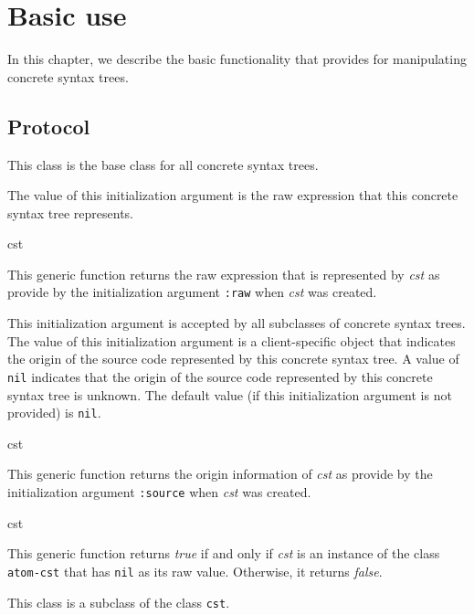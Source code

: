 \chapter{Basic use}

In this chapter, we describe the basic functionality that \sysname{}
provides for manipulating concrete syntax trees.

\section{Protocol}


This class is the base class for all concrete syntax trees.


The value of this initialization argument is the raw \commonlisp{}
expression that this concrete syntax tree represents.

 {cst}

This generic function returns the raw \commonlisp{} expression that is
represented by \textit{cst} as provide by the
initialization argument \texttt{:raw} when \textit{cst} was
created.


This initialization argument is accepted by all subclasses of concrete
syntax trees.  The value of this initialization argument is a
client-specific object that indicates the origin of the source code
represented by this concrete syntax tree.  A value of \texttt{nil}
indicates that the origin of the source code represented by this concrete
syntax tree is unknown.  The default value (if this initialization
argument is not provided) is \texttt{nil}.

 {cst}

This generic function returns the origin information of \textit{cst}
as provide by the initialization argument \texttt{:source} when
\textit{cst} was created.

 {cst}

This generic function returns \emph{true} if and only if \textit{cst}
is an instance of the class \texttt{atom-cst} that has \texttt{nil} as
its raw value.  Otherwise, it returns \emph{false}.


This class is a subclass of the class \texttt{cst}.


